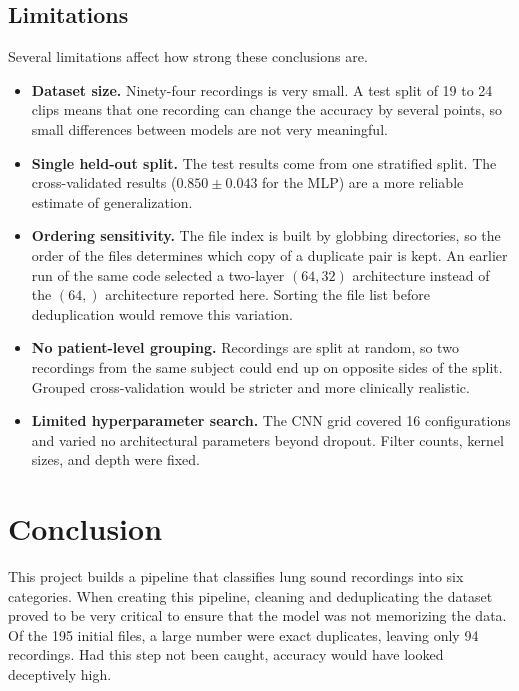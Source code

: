 \documentclass[conference]{IEEEtran}
\begin{document}
\subsection{Limitations}
Several limitations affect how strong these conclusions are.

\begin{itemize}
    \item \textbf{Dataset size.} Ninety-four recordings is very small. A test
    split of 19 to 24 clips means that one recording can change the accuracy by
    several points, so small differences between models are not very meaningful.
    \item \textbf{Single held-out split.} The test results come from one
    stratified split. The cross-validated results ($0.850 \pm 0.043$ for the MLP)
    are a more reliable estimate of generalization.
    \item \textbf{Ordering sensitivity.} The file index is built by globbing
    directories, so the order of the files determines which copy of a duplicate
    pair is kept. An earlier run of the same code selected a two-layer $(64,
    32)$ architecture instead of the $(64,)$ architecture reported here. Sorting
    the file list before deduplication would remove this variation.
    \item \textbf{No patient-level grouping.} Recordings are split at random, so
    two recordings from the same subject could end up on opposite sides of the
    split. Grouped cross-validation would be stricter and more clinically
    realistic.
    \item \textbf{Limited hyperparameter search.} The CNN grid covered 16
    configurations and varied no architectural parameters beyond dropout. Filter
    counts, kernel sizes, and depth were fixed.
\end{itemize}

\section{Conclusion}

This project builds a pipeline that classifies lung sound recordings into six
categories. When creating this pipeline, cleaning and deduplicating the dataset
proved to be very critical to ensure that the model was not memorizing the data.
Of the 195 initial files, a large number were exact duplicates, leaving only 94
recordings. Had this step not been caught, accuracy would have looked deceptively high.
\end{document}
